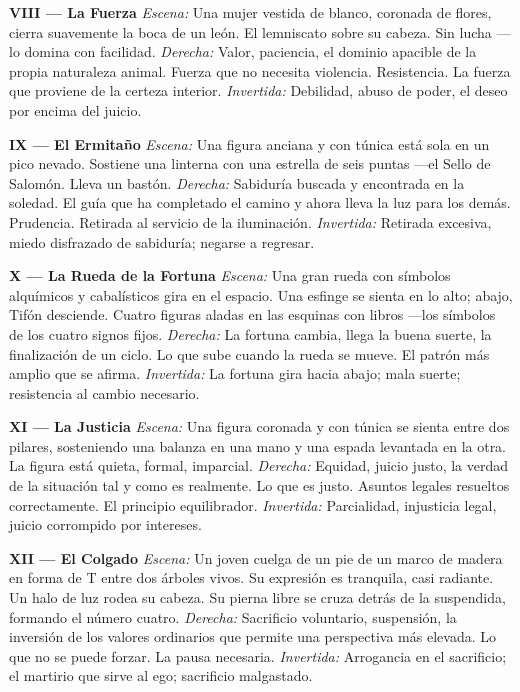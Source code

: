 \textbf{VIII --- La Fuerza} \emph{Escena:} Una mujer vestida de blanco, coronada de flores, cierra suavemente la boca de un león. El lemniscato sobre su cabeza. Sin lucha ---lo domina con facilidad. \emph{Derecha:} Valor, paciencia, el dominio apacible de la propia naturaleza animal. Fuerza que no necesita violencia. Resistencia. La fuerza que proviene de la certeza interior. \emph{Invertida:} Debilidad, abuso de poder, el deseo por encima del juicio.

\textbf{IX --- El Ermitaño} \emph{Escena:} Una figura anciana y con túnica está sola en un pico nevado. Sostiene una linterna con una estrella de seis puntas ---el Sello de Salomón. Lleva un bastón. \emph{Derecha:} Sabiduría buscada y encontrada en la soledad. El guía que ha completado el camino y ahora lleva la luz para los demás. Prudencia. Retirada al servicio de la iluminación. \emph{Invertida:} Retirada excesiva, miedo disfrazado de sabiduría; negarse a regresar.

\textbf{X --- La Rueda de la Fortuna} \emph{Escena:} Una gran rueda con símbolos alquímicos y cabalísticos gira en el espacio. Una esfinge se sienta en lo alto; abajo, Tifón desciende. Cuatro figuras aladas en las esquinas con libros ---los símbolos de los cuatro signos fijos. \emph{Derecha:} La fortuna cambia, llega la buena suerte, la finalización de un ciclo. Lo que sube cuando la rueda se mueve. El patrón más amplio que se afirma. \emph{Invertida:} La fortuna gira hacia abajo; mala suerte; resistencia al cambio necesario.

\textbf{XI --- La Justicia} \emph{Escena:} Una figura coronada y con túnica se sienta entre dos pilares, sosteniendo una balanza en una mano y una espada levantada en la otra. La figura está quieta, formal, imparcial. \emph{Derecha:} Equidad, juicio justo, la verdad de la situación tal y como es realmente. Lo que es justo. Asuntos legales resueltos correctamente. El principio equilibrador. \emph{Invertida:} Parcialidad, injusticia legal, juicio corrompido por intereses.

\textbf{XII --- El Colgado} \emph{Escena:} Un joven cuelga de un pie de un marco de madera en forma de T entre dos árboles vivos. Su expresión es tranquila, casi radiante. Un halo de luz rodea su cabeza. Su pierna libre se cruza detrás de la suspendida, formando el número cuatro. \emph{Derecha:} Sacrificio voluntario, suspensión, la inversión de los valores ordinarios que permite una perspectiva más elevada. Lo que no se puede forzar. La pausa necesaria. \emph{Invertida:} Arrogancia en el sacrificio; el martirio que sirve al ego; sacrificio malgastado.

